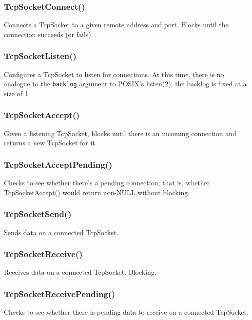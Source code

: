 \documentclass{article}
\begin{document}
\subsubsection{TcpSocketConnect()}

Connects a TcpSocket to a given remote address and port.  Blocks until
the connection succeeds (or fails).

\subsubsection{TcpSocketListen()}

Configures a TcpSocket to listen for connections.  At this time, there
is no analogue to the {\tt backlog} argument to POSIX's listen(2); the
backlog is fixed at a size of 1.

\subsubsection{TcpSocketAccept()}

Given a listening TcpSocket, blocks until there is an incoming
connection and returns a new TcpSocket for it.

\subsubsection{TcpSocketAcceptPending()}

Checks to see whether there's a pending connection; that is, whether
TcpSocketAccept() would return non-NULL without blocking.

\subsubsection{TcpSocketSend()}

Sends data on a connected TcpSocket.

\subsubsection{TcpSocketReceive()}

Receives data on a connected TcpSocket.  Blocking.

\subsubsection{TcpSocketReceivePending()}

Checks to see whether there is pending data to receive on a connected
TcpSocket.
\end{document}
